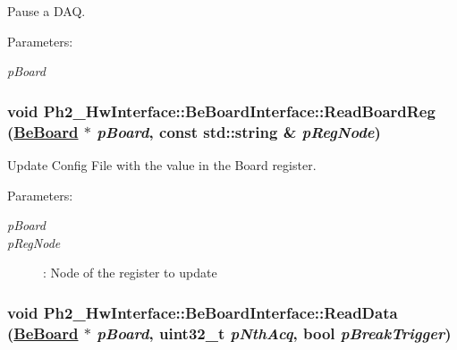 Pause a DAQ. 

\begin{Desc}
\item[Parameters:]
\begin{description}
\item[{\em p\-Board}]\end{description}
\end{Desc}
\hypertarget{class_ph2___hw_interface_1_1_be_board_interface_1b3096f0b052d6e9329fdb3b9a8299fb}{
\subsubsection[ReadBoardReg]{\setlength{\rightskip}{0pt plus 5cm}void Ph2\_\-Hw\-Interface::Be\-Board\-Interface::Read\-Board\-Reg (\hyperlink{class_ph2___hw_description_1_1_be_board}{Be\-Board} $\ast$ {\em p\-Board}, const std::string \& {\em p\-Reg\-Node})}}
\label{class_ph2___hw_interface_1_1_be_board_interface_1b3096f0b052d6e9329fdb3b9a8299fb}


Update Config File with the value in the Board register. 

\begin{Desc}
\item[Parameters:]
\begin{description}
\item[{\em p\-Board}]\item[{\em p\-Reg\-Node}]: Node of the register to update \end{description}
\end{Desc}
\hypertarget{class_ph2___hw_interface_1_1_be_board_interface_3e5106285fa795c21cb9d20fbf753759}{
\subsubsection[ReadData]{\setlength{\rightskip}{0pt plus 5cm}void Ph2\_\-Hw\-Interface::Be\-Board\-Interface::Read\-Data (\hyperlink{class_ph2___hw_description_1_1_be_board}{Be\-Board} $\ast$ {\em p\-Board}, uint32\_\-t {\em p\-Nth\-Acq}, bool {\em p\-Break\-Trigger})}}
\label{class_ph2___hw_interface_1_1_be_board_interface_3e5106285fa795c21cb9d20fbf753759}


